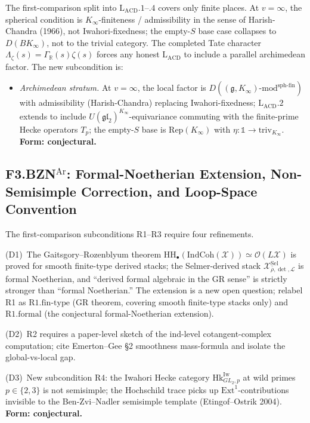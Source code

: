 The first-comparison split into \(\mathrm{L}_{\mathrm{ACD}}.1\)--\(.4\)
covers only finite places. At \(v=\infty\), the spherical condition
is \(K_{\infty}\)-finiteness / admissibility in the sense of
Harish-Chandra (1966), not Iwahori-fixedness; the empty-\(S\) base
case collapses to \(D(BK_{\infty})\), not to the trivial category.
The completed Tate character
\(\Lambda_{\zeta}(s)=\Gamma_{\mathbb{R}}(s)\zeta(s)\) forces
any honest \(\mathrm{L}_{\mathrm{ACD}}\) to include a parallel
archimedean factor. The new subcondition is:
\begin{itemize}
\item[(\(\mathrm{L}_{\mathrm{ACD}}.0\))] \emph{Archimedean stratum.}
At \(v=\infty\), the local factor is
\(D((\mathfrak{g},K_{\infty})\text{-mod}^{\mathrm{sph\text{-}fin}})\)
with admissibility (Harish-Chandra) replacing Iwahori-fixedness;
\(\mathrm{L}_{\mathrm{ACD}}.2\) extends to include
\(U(\mathfrak{gl}_{2})^{K_{\infty}}\)-equivariance commuting with
the finite-prime Hecke operators \(T_{p}\); the empty-\(S\) base is
\(\mathrm{Rep}(K_{\infty})\) with
\(\eta:\mathbb{1}\to\mathrm{triv}_{K_{\infty}}\).
\textbf{Form: conjectural.}
\end{itemize}

\subsection{\texorpdfstring{F3.BZN\(^{\mathrm{Ar}}\)}{F3-BZN-Ar}: Formal-Noetherian Extension, Non-Semisimple Correction, and Loop-Space Convention}

The first-comparison subconditions R1--R3 require four refinements.

(D1)~The Gaitsgory--Rozenblyum theorem
\(\mathrm{HH}_\bullet(\mathrm{IndCoh}(\mathcal{X}))\simeq\mathcal{O}(L\mathcal{X})\)
is proved for smooth finite-type derived stacks; the Selmer-derived
stack \(\mathcal{X}^{\mathrm{Sel}}_{\bar\rho,\det,\mathcal{L}}\) is
formal Noetherian, and ``derived formal algebraic in the GR sense''
is strictly stronger than ``formal Noetherian.'' The extension is a
new open question; relabel R1 as
\(\mathrm{R1.fin\text{-}type}\) (GR theorem, covering smooth
finite-type stacks only) and \(\mathrm{R1.formal}\) (the conjectural
formal-Noetherian extension).

(D2)~R2 requires a paper-level sketch of the ind-level
cotangent-complex computation; cite Emerton--Gee \S2 smoothness
mass-formula and isolate the global-vs-local gap.

(D3)~New subcondition R4: the Iwahori Hecke category
\(\mathrm{Hk}^{\mathrm{Iw}}_{GL_{2},p}\) at wild primes
\(p\in\{2,3\}\) is not semisimple; the Hochschild trace picks up
\(\mathrm{Ext}^{1}\)-contributions invisible to the Ben-Zvi--Nadler
semisimple template (Etingof--Ostrik 2004).
\textbf{Form: conjectural.}


